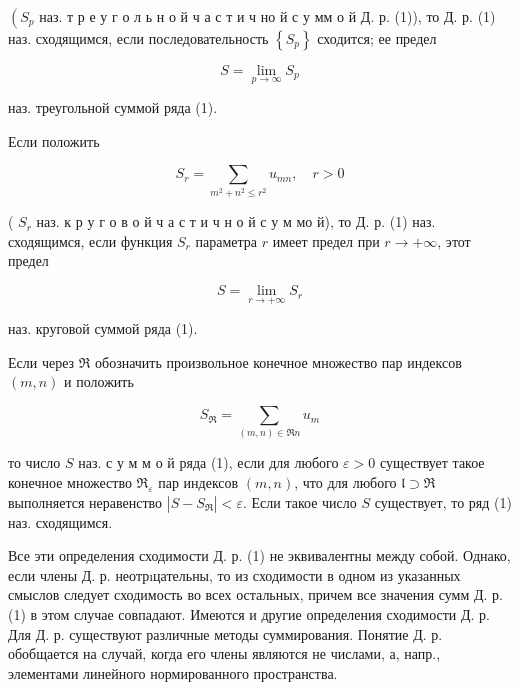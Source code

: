 \documentclass[10pt]{article}
\begin{document}
$\left(S_{p}\right.$ наз. т р е у г о л ь н о й ч а с т и ч но й с у мм о й Д. р. (1)), то Д. р. (1) наз. сходящимся, если последовательность $\left\{S_{p}\right\}$ сходится; ее предел



\[

S=\lim _{p \rightarrow \infty} S_{p}

\]



наз. треугольной суммой ряда (1).



Если положить



\[

S_{r}=\sum_{m^{2}+n^{2} \leqslant r^{2}} u_{m n}, \quad r>0

\]



( $S_{r}$ наз. к р у г о в о й ч а с т и ч н о й с у м мо й), то Д. р. (1) наз. сходящимся, если функция $S_{r}$ параметра $r$ имеет предел при $r \rightarrow+\infty$, этот предел



\[

S=\lim _{r \rightarrow+\infty} S_{r}

\]



наз. круговой суммой ряда (1).



Если через $\mathfrak{R}$ обозначить произвольное конечное множество пар индексов $(m, n)$ и положить



\[

S_{\Re}=\sum_{(m, n) \in \mathfrak{\Re} n} u_{m}

\]



то число $S$ наз. с у м м о й ряда (1), если для любого $\varepsilon>0$ существует такое конечное множество $\Re_{\varepsilon}$ пар индексов $(m, n)$, что для любого $\mathfrak{l} \supset \mathfrak{\Re}$ выполняется неравенство $\left|S-S_{\mathfrak{\Re}}\right|<\varepsilon$. Если такое число $S$ существует, то ряд (1) наз. сходящимся.



Все эти определения сходимости Д. р. (1) не эквивалентны между собой. Однако, если члены Д. р. неотрıцательны, то из сходимости в одном из указанных смыслов следует сходимость во всех остальных, причем все значения сумм Д. р. (1) в этом случае совпадают. Имеются и другие определения сходимости Д. р. Для Д. р. существуют различные методы суммирования. Понятие Д. р. обобщается на случай, когда его члены являются не числами, а, напр., элементами линейного нормированного пространства.
\end{document}
